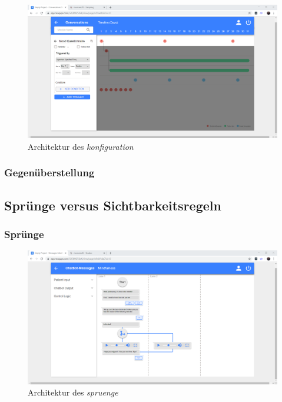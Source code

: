 \begin{figure}[h]
\centering
\includegraphics[width=1\textwidth]{pictures/konfiguration}
\caption{Architektur des \emph{konfiguration}}
\label{therapyBuilder}
\end{figure}


\subsubsection{Gegenüberstellung}


\subsection{Sprünge versus Sichtbarkeitsregeln}

\subsubsection{Sprünge}
\begin{figure}[h]
\centering
\includegraphics[width=1\textwidth]{pictures/spruenge}
\caption{Architektur des \emph{spruenge}}
\label{therapyBuilder}
\end{figure}



